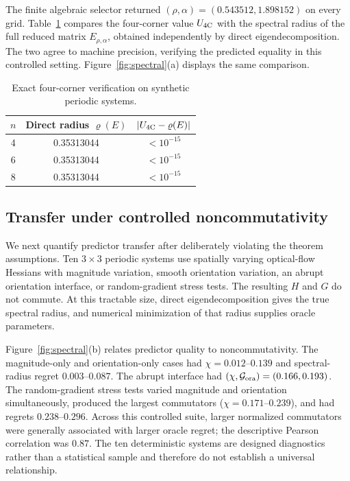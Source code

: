 \documentclass[pdflatex,iicol,sn-mathphys-num]{sn-jnl}
\theoremstyle{definition}
\newcommand{\spr}{\varrho}
\begin{document}
The finite algebraic selector returned
$(\rho,\alpha)=(0.543512,1.898152)$ on every grid. Table~\ref{tab:constant}
compares the four-corner value $U_{\rm 4C}$ with the spectral radius of the
full reduced matrix $E_{\rho,\alpha}$, obtained independently by direct
eigendecomposition. The two agree to machine precision, verifying the
predicted equality in this controlled setting. Figure~\ref{fig:spectral}(a)
displays the same comparison.

\begin{table}[t]
\centering
\footnotesize
\caption{Exact four-corner verification on synthetic periodic systems.}
\label{tab:constant}
\begin{tabular}{ccc}
\toprule
$n$ & Direct radius $\spr(E)$ & $|U_{\rm 4C}-\spr(E)|$\\
\midrule
4 & 0.35313044 & $<10^{-15}$\\
6 & 0.35313044 & $<10^{-15}$\\
8 & 0.35313044 & $<10^{-15}$\\
\bottomrule
\end{tabular}
\end{table}

\subsection{Transfer under controlled noncommutativity}
We next quantify predictor transfer after deliberately violating the theorem
assumptions. Ten $3\times3$ periodic systems use spatially varying optical-flow
Hessians with magnitude variation, smooth orientation variation, an abrupt
orientation interface, or random-gradient stress tests. The resulting $H$ and
$G$ do not commute. At this tractable size, direct eigendecomposition gives
the true spectral radius, and numerical minimization of that radius supplies
oracle parameters.

Figure~\ref{fig:spectral}(b) relates predictor quality to noncommutativity.
The magnitude-only and orientation-only cases had $\chi=0.012$--$0.139$ and
spectral-radius regret $0.003$--$0.087$. The abrupt interface had
$(\chi,\mathcal G_{\rm ora})=(0.166,0.193)$. The random-gradient stress tests
varied magnitude and orientation simultaneously, produced the largest
commutators ($\chi=0.171$--$0.239$), and had regrets $0.238$--$0.296$. Across
this controlled suite, larger normalized commutators were generally associated
with larger oracle regret; the descriptive Pearson correlation was $0.87$.
The ten deterministic systems are designed diagnostics rather than a
statistical sample and therefore do not establish a universal relationship.
\end{document}
